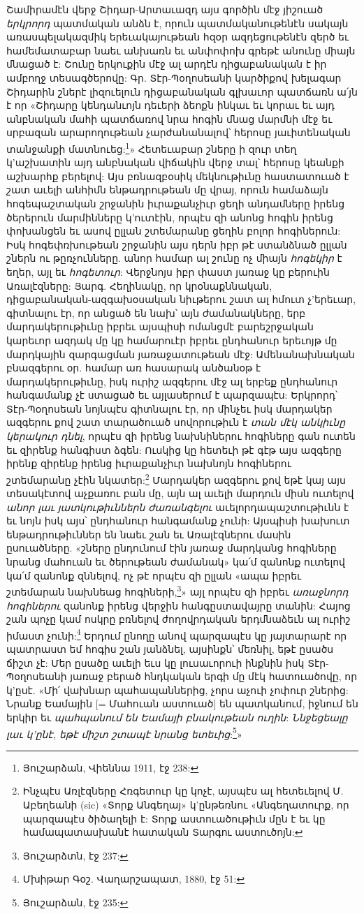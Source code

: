 \documentclass{article}
\begin{document}
{Շամիրամէն վերջ Շիդար-Արտաւազդ այս գործին մէջ յիշուած \emph{երկրորդ} պատմական անձն է, որուն պատմականութենէն սակայն առասպելակազմիկ երեւակայութեան հզօր ազդեցութենէն զերծ եւ համեմատաբար նաեւ անխառն եւ անփոփոխ գրեթէ անունը միայն մնացած է: Շունը երկուքին մէջ ալ արդէն դիցաբանական է իր ամբողջ տեսագծերովը: Գր. Տէր-Պօղոսեանի կարծիքով խելագար Շիդարին շներէ լիզուելուն դիցաբանական գլխաւոր պատճառն ա՛յն է որ «Շիդարը կենդանւոյն դեւերի ձեոքն ինկաւ եւ կորաւ եւ այդ անբնական մահի պատճառով նրա հոգին մնաց մարմնի մէջ եւ սրբազան արարողութեան չարժանանալով՝ հերոսը յաւիտենական տանջանքի մատնուեց:\footnote{Յուշարձան, Վիեննա 1911, էջ 238:}» Հետեւաբար շները ի զուր տեղ կ'աշխատին այդ անբնական վիճակին վերջ տալ՝ հերոսը կեանքի աշխարհք բերելով: Այս բռնազբօսիկ մեկնութիւնը հաստատուած է շատ աւելի անհիմն ենթադրութեան մը վրայ, որուն համաձայն հոգեպաշտական շրջանին իւրաքանչիւր ցեղի անդամները իրենց ծերերուն մարմինները կ'ուտէին, որպէս զի անոնց հոգին իրենց փոխանցեն եւ ասով ըլլան շտեմարանը ցեղին բոլոր հոգիներուն: Իսկ հոգեփռխութեան շրջանին այս դերն իբր թէ ստանձնած ըլլան շներն ու թըռչունները. անոր համար ալ շունը ոչ միայն \emph{հոգեկիր} է եղեր, այլ եւ \emph{հոգետուր}: Վերջնոյս իբր փաստ յառաջ կը բերուին Առալէզները: Յարգ. Հեղինակը, որ կրօնաքննական, դիցաբանական-ազգախօսական նիւթերու շատ ալ հմուտ չ'երեւար, գիտնալու էր, որ անցած են նախ՝ այն ժամանակները, երբ մարդակերութիւնը իբրեւ այսպիսի ոմանցմէ բարեշրջական կարեւոր ազդակ մը կը համարուէր իբրեւ ընդհանուր երեւոյթ մը մարդկային զարգացման յառաջատութեան մէջ: Ամենանախնական բնազգերու օր. համար առ հասարակ անծանօթ է մարդակերութիւնը, իսկ ուրիշ ազգերու մէջ ալ երբեք ընդհանուր հանգամանք չէ ստացած եւ այլասերում է պարզապէս: Երկրորդ՝ Տէր-Պօղոսեան նոյնպէս գիտնալու էր, որ մինչեւ իսկ մարդակեր ազգերու քով շատ տարածուած սովորութիւն է \emph{տան մէկ անկիւնը կերակուր դնել}, որպէս զի իրենց նախնիներու հոգիները գան ուտեն եւ զիրենք հանգիստ ձգեն: Ուսկից կը հետեւի թէ գէթ այս ազգերը իրենք զիրենք իրենց իւրաքանչիւր նախնոյն հոգիներու շտեմարանը չէին նկատեր:\footnote{Ինչպէս Առլէզները Հռգետուր կը կոչէ, այսպէս ալ հետեւելով Մ. Աբեղեանի (sic) «Տորք Անգեղայ» կ'ընթեռնու «Անգեղատուրք, որ պարզապէս ծիծաղելի է: Տորք աստուածութիւն մըն է եւ կը համապատասխանէ հատական Տարգու աստուծոյն:} Մարդակեր ազգերու քով եթէ կայ այս տեսակէտով աչքառու բան մը, այն ալ աւելի մարդուն միսն ուտելով \emph{անոր լաւ յատկութիւններն ժառանգելու} աւելորդապաշտութիւնն է եւ նոյն իսկ այս՝ ընդհանուր հանգամանք չունի: Այսպիսի խախուտ ենթադրութիւններ են նաեւ շան եւ Առալէզներու մասին ըսուածները. «շները ընդունում էին յառաջ մարդկանց հոգիները նրանց մահուան եւ ծերութեան ժամանակ» կա՛մ զանոնք ուտելով կա՛մ զանոնք զննելով, ոչ թէ որպէս զի ըլլան «ապա իբրեւ շտեմարան նախնեաց հոգիների,\footnote{Յուշարձտն, էջ 237:}» այլ որպէս զի իբրեւ \emph{առաջնորդ հոգիներու} զանոնք իրենց վերջին հանգըստավայրը տանին: Հայոց շան պոչը կամ ոսկրը բռնելով ժողովրդական երդմնաձեւն ալ ուրիշ իմաստ չունի:\footnote{Մխիթար Գօշ. Վաղարշապատ, 1880, էջ 51:} Երդում ընողը անով պարզապէս կը յայտարարէ որ պատրաստ եմ հոգիս շան յանձնել, այսինքն՝ մեռնիլ, եթէ ըսածս ճիշտ չէ: Մեր ըսածը աւելի եւս կը լուսաւորուի ինքնին իսկ Տէր-Պօղոսեանի յառաջ բերած հնդկական երգի մը մէկ հատուածովը, որ կ'ըսէ. «Մի՛ վախնար պահապաններից, չորս աչուի չոփուր շներից: Նրանք Եամային [= Մահուան աստուած] են պատկանում, իջնում են երկիր եւ \emph{պահպանում են Եամայի բնակութեան ուղին}: \emph{Ննջեցեալը լաւ կ'ընէ, եթէ միշտ շտապէ նրանց ետեւից}:\footnote{Յուշարձան, էջ 235:}»

}
\end{document}
